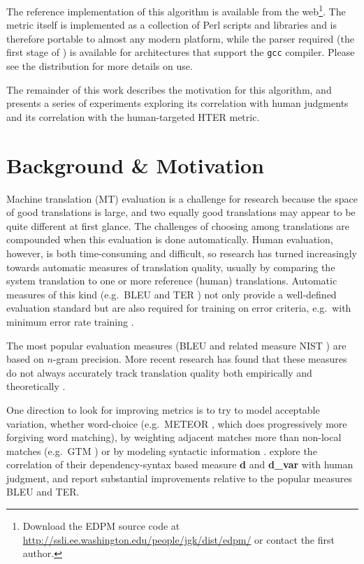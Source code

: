 \documentclass[11pt]{article}
\begin{document}
The reference implementation of this algorithm is available from the
web\footnote{Download the EDPM source code at
  \url{http://ssli.ee.washington.edu/people/jgk/dist/edpm/} or contact
  the first author.}.  The metric itself is implemented as a
collection of Perl scripts and libraries and is therefore portable to
almost any modern platform, while the parser required (the first stage
of \cite{charniak-johnson:2005:ACL}) is available for architectures
that support the \texttt{gcc} compiler.  Please see the distribution
for more details on use.

The remainder of this work describes the motivation for this
algorithm, and presents a series of experiments exploring its
correlation with human judgments and its correlation with the
human-targeted HTER metric.

\section{Background \& Motivation}

Machine translation (MT) evaluation is a challenge for research
because the space of good translations is large, and two equally good
translations may appear to be quite different at first glance. 
%
The challenges of choosing among translations are compounded when this
evaluation is done automatically.
%
Human evaluation, however, is both time-consuming and difficult, so
research %
has turned increasingly towards automatic measures of translation
quality, usually by comparing the system translation to one or more
reference (human) translations.
%
Automatic measures of this kind (e.g.\ BLEU \cite{papineni02bleu} and
TER \cite{snover06ter}) not only provide a well-defined evaluation
standard but are also required for training on error criteria, e.g.\
with minimum error rate training \cite{och03mert}.

The most popular evaluation measures (BLEU and related measure NIST
\cite{doddington02nist}) are based on $n$-gram precision.  More recent
research has found that these measures do not always accurately track
translation quality both empirically \cite{charniak03syntaxlmmt} and
theoretically \cite{callisonburch06bleuproblems}.

One direction to look for improving metrics is to try to model
acceptable variation, whether word-choice (e.g.\ METEOR
\cite{banerjee05meteor}, which does progressively more forgiving word
matching), by weighting adjacent matches more than non-local matches
(e.g.\ GTM \cite{turian03mteval}) or by modeling syntactic information
\cite{liu05syntaxformteval}.
 explore the correlation of their
dependency-syntax based measure \textbf{d} and \textbf{d\_var} with
human judgment, and report substantial improvements relative to the
popular measures BLEU and TER.
\end{document}

